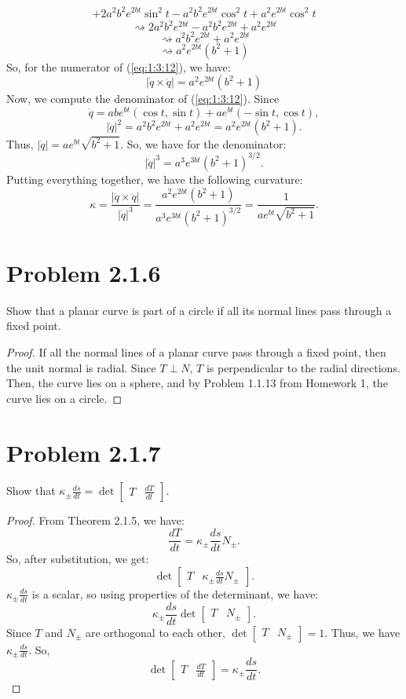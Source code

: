 \documentclass[12pt]{article}
\newcommand\abs[1]{\left| #1 \right|}
\newcommand\parens[1]{\left( #1 \right)}
\newcommand\solproof[1]{\begin{mdframed}
\begin{proof} #1
\end{proof}
\end{mdframed}}
\begin{document}
{\begin{multline*}
        + 2a^2b^2e^{2bt}\sin^2 t - a^2b^2e^{2bt}\cos^2 t + a^2e^{2bt}\cos^2 t
    \end{multline*}
    \[\rightsquigarrow 2a^2b^2e^{2bt} - a^2b^2e^{2bt} + a^2e^{2bt}\]
    \[\rightsquigarrow a^2b^2e^{2bt} + a^2e^{2bt}\]
    \[\rightsquigarrow a^2e^{2bt}\parens{b^2 + 1}\]
    So, for the numerator of (\ref{eq:1:3:12}), we have:
    \[\abs{\dot{q} \times \ddot{q}} = a^2e^{2bt}\parens{b^2 + 1}\]
    Now, we compute the denominator of (\ref{eq:1:3:12}). Since
    \[\dot{q} = abe^{bt}\parens{\cos t, \sin t} + ae^{bt}\parens{-\sin t, \cos t},\] 
    \[\abs{\dot{q}}^2 = a^2b^2e^{2bt} + a^2e^{2bt} = a^2e^{2bt}(b^2 + 1).\] 
    Thus, $\abs{\dot{q}} = ae^{bt}\sqrt{b^2 + 1}$. So, we have for the denominator:
    \[\abs{\dot{q}}^3 = a^3e^{3bt}\parens{b^2 + 1}^{3/2}.\]
    Putting everything together, we have the following curvature:
    \[\kappa = \frac{\abs{\dot{q} \times \ddot{q}}}{\abs{\dot{q}}^3} = \frac{a^2e^{2bt}\parens{b^2 + 1}}{a^3e^{3bt}\parens{b^2 + 1}^{3/2}} = \boxed{\frac{1}{ae^{bt}\sqrt{b^2 + 1}}}.\]
}

\section*{Problem 2.1.6}
Show that a planar curve is part of a circle if all its normal lines pass through a fixed point.

\solproof{
    If all the normal lines of a planar curve pass through a fixed point, then the unit normal is radial. Since $T \perp N$, $T$ is perpendicular to the radial directions. Then, the curve lies on a sphere, and by Problem 1.1.13 from Homework 1, the curve lies on a circle. 
}

\section*{Problem 2.1.7}
Show that $\kappa_\pm \frac{ds}{dt} = \det
\begin{bmatrix}
    T & \frac{dT}{dt}
\end{bmatrix}$.

\solproof{
    From Theorem 2.1.5, we have:
    \[\frac{dT}{dt} = \kappa_\pm \frac{ds}{dt} N_\pm.\]
    So, after substitution, we get:
    \[\det
    \begin{bmatrix}
        T & \kappa_\pm \frac{ds}{dt} N_\pm
    \end{bmatrix}.\]
    $\kappa_\pm \frac{ds}{dt}$ is a scalar, so using properties of the determinant, we have:
    \[\kappa_\pm \frac{ds}{dt} \det
    \begin{bmatrix}
        T & N_\pm
    \end{bmatrix}.\]
    Since $T$ and $N_\pm$ are orthogonal to each other,
    $\det
    \begin{bmatrix}
        T & N_\pm
    \end{bmatrix} = 1$.
    Thus, we have $\kappa_\pm \frac{ds}{dt}$. So,
    \[\det
    \begin{bmatrix}
        T & \frac{dT}{dt}
    \end{bmatrix} = \kappa_\pm \frac{ds}{dt}.\]
}
\end{document}
